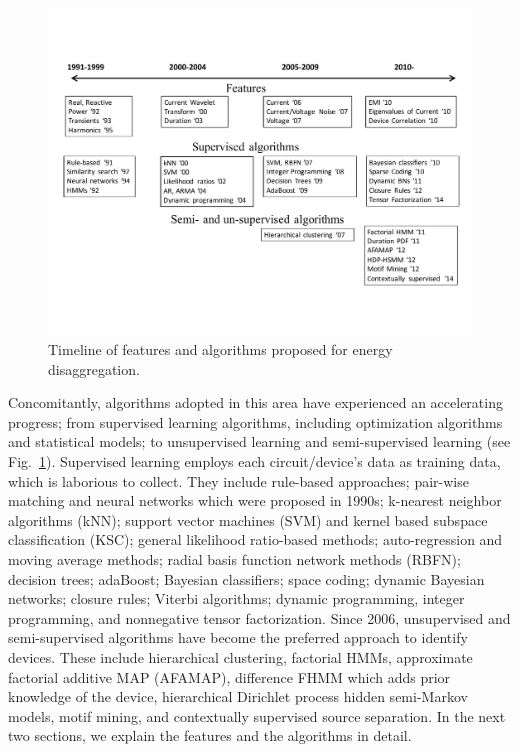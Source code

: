 \begin{figure}[ht]
\centering
\includegraphics[width=5in]{figs/algo-timeline.pdf}
\caption{Timeline of features and algorithms proposed for energy disaggregation.}
\label{fig_timeline}
\end{figure}

Concomitantly,
algorithms adopted in this area have experienced an accelerating progress;
from supervised learning algorithms, including optimization algorithms 
and statistical models; 
to unsupervised learning and semi-supervised learning 
(see Fig.~\ref{fig_timeline}).
Supervised learning employs each circuit/device's data
as training data, which is laborious to collect.
They include rule-based approaches; pair-wise matching
and neural  networks which were proposed in 1990s;
k-nearest neighbor algorithms (kNN); support vector machines (SVM) and kernel based
subspace classification (KSC); general likelihood ratio-based methods;
auto-regression and moving average methods; 
radial basis function network methods (RBFN);
decision trees; adaBoost; Bayesian classifiers;
space coding; dynamic Bayesian networks; closure rules;
Viterbi algorithms; dynamic programming, integer programming, 
and nonnegative tensor factorization.
Since 2006, unsupervised and semi-supervised algorithms
have become the preferred approach to identify devices.
These include hierarchical clustering,
factorial HMMs, 
approximate factorial additive MAP (AFAMAP),
difference FHMM which adds prior knowledge of the device, 
hierarchical Dirichlet process hidden semi-Markov models,
motif mining, and contextually supervised source separation. 
In the next two sections, we explain the features and the algorithms in detail.




